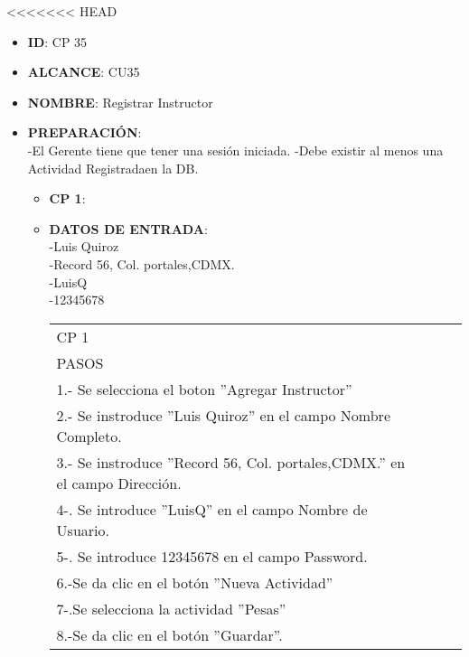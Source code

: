 <<<<<<< HEAD

% 


\begin{itemize}
\item \textbf{ID}: CP 35
\item \textbf{ALCANCE}: CU35
\item \textbf{NOMBRE}: Registrar Instructor
\item \textbf{PREPARACIÓN}:\\
		-El Gerente tiene que tener una sesión iniciada.
		-Debe existir al menos una Actividad Registradaen la DB.
\begin{itemize}
\item \textbf{CP 1}:
\item \textbf{DATOS DE ENTRADA}:\\
-Luis Quiroz\\
-Record 56, Col. portales,CDMX.\\
-LuisQ\\
-12345678\\
	\begin{center}			
	\begin{tabular}{||l|l|l|l||}
		\hline
		\hline
			CP 1\\
			PASOS\\
			\hline 1.- Se selecciona el boton ''Agregar Instructor''\\
			\hline 2.- Se instroduce ''Luis Quiroz'' en el campo  Nombre Completo.\\
			\hline 3.- Se instroduce ''Record 56, Col. portales,CDMX.'' en el campo  Dirección.\\
			\hline 4-. Se introduce  ''LuisQ'' en el campo Nombre de Usuario.\\
			\hline 5-. Se introduce  12345678  en el campo Password.\\
            \hline 6.-Se da clic en el botón ''Nueva Actividad''\\
            \hline 7-.Se selecciona la actividad ''Pesas''\\
            \hline 8.-Se da clic en el botón ''Guardar''.\\
        \hline
		\hline
	\end{tabular}
	\end{center}

\end{itemize}
\end{itemize}

